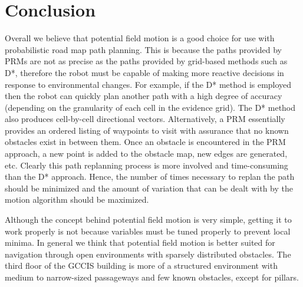 \documentclass[12pt]{article}
\begin{document}
\section{Conclusion}

Overall we believe that potential field motion is a good choice for use with probabilistic road map path planning. This is because the paths provided by PRMs are not as precise as the paths provided by grid-based methods such as D*, therefore the robot must be capable of making more reactive decisions in response to environmental changes. For example, if the D* method is employed then the robot can quickly plan another path with a high degree of accuracy (depending on the granularity of each cell in the evidence grid). The D* method also produces cell-by-cell directional vectors. Alternatively, a PRM essentially provides an ordered listing of waypoints to visit with assurance that no known obstacles exist in between them. Once an obstacle is encountered in the PRM approach, a new point is added to the obstacle map, new edges are generated, etc. Clearly this path replanning process is more involved and time-consuming than the D* approach. Hence, the number of times necessary to replan the path should be minimized and the amount of variation that can be dealt with by the motion algorithm should be maximized.

Although the concept behind potential field motion is very simple, getting it to work properly is not because variables must be tuned properly to prevent local minima. In general we think that potential field motion is better suited for navigation through open environments with sparsely distributed obstacles. The third floor of the GCCIS building is more of a structured environment with medium to narrow-sized passageways and few known obstacles, except for pillars. 
\end{document}
